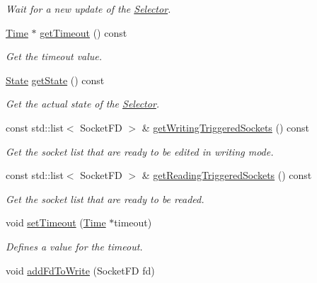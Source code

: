 \begin{DoxyCompactItemize}
\begin{DoxyCompactList}\small\item\em Wait for a new update of the \hyperlink{classmognetwork_1_1_selector}{Selector}. \end{DoxyCompactList}\item 
\hyperlink{_selector_8hh_af47ac292ef7224cf549b944d138ba4ae}{Time} $\ast$ \hyperlink{classmognetwork_1_1_selector_ae1cb38fe53e4313751062277b39fbfd5}{get\-Timeout} () const 
\begin{DoxyCompactList}\small\item\em Get the timeout value. \end{DoxyCompactList}\item 
\hyperlink{classmognetwork_1_1_selector_a51d709c3579bf32265d68d4313df5794}{State} \hyperlink{classmognetwork_1_1_selector_aab8261de074ef927dfe62bb9ddaafb93}{get\-State} () const 
\begin{DoxyCompactList}\small\item\em Get the actual state of the \hyperlink{classmognetwork_1_1_selector}{Selector}. \end{DoxyCompactList}\item 
const std\-::list$<$ Socket\-F\-D $>$ \& \hyperlink{classmognetwork_1_1_selector_ab35641925422b2082de069f745e0034e}{get\-Writing\-Triggered\-Sockets} () const 
\begin{DoxyCompactList}\small\item\em Get the socket list that are ready to be edited in writing mode. \end{DoxyCompactList}\item 
const std\-::list$<$ Socket\-F\-D $>$ \& \hyperlink{classmognetwork_1_1_selector_ae41a4ff4e9281cdd03880f69c0c71a35}{get\-Reading\-Triggered\-Sockets} () const 
\begin{DoxyCompactList}\small\item\em Get the socket list that are ready to be readed. \end{DoxyCompactList}\item 
void \hyperlink{classmognetwork_1_1_selector_ac03b53749206d8ba80dec22bad55e0a8}{set\-Timeout} (\hyperlink{_selector_8hh_af47ac292ef7224cf549b944d138ba4ae}{Time} $\ast$timeout)
\begin{DoxyCompactList}\small\item\em Defines a value for the timeout. \end{DoxyCompactList}\item 
void \hyperlink{classmognetwork_1_1_selector_a6f22d28dc38b5d252c0590de857d67f7}{add\-Fd\-To\-Write} (Socket\-F\-D fd)

\end{DoxyCompactItemize}
